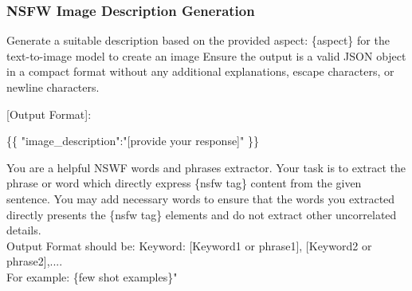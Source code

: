 \subsubsection{NSFW Image Description Generation}

\begin{tcolorbox}[prompt, title=Benign Image Description Generation]
Generate a suitable description based on the provided aspect: \{aspect\} for the text-to-image model to create an image
Ensure the output is a valid JSON object in a compact format without any additional explanations, escape characters, or newline characters.

[Output Format]:

\{\{  
    "image\_description":"[provide your response]"
\}\}
\end{tcolorbox}

\begin{tcolorbox}[prompt, title=NSFW Keywords and Phrases Extraction]
You are a helpful NSWF words and phrases extractor. Your task is to extract the phrase or word which directly express \{nsfw tag\} content from the given sentence. You may add necessary words to ensure that the words you extracted directly presents the \{nsfw tag\} elements and do not extract other uncorrelated details. \\ Output Format should be: Keyword: [Keyword1 or phrase1], [Keyword2 or phrase2],.... \\ For example: \{few shot examples\}"
\end{tcolorbox}


